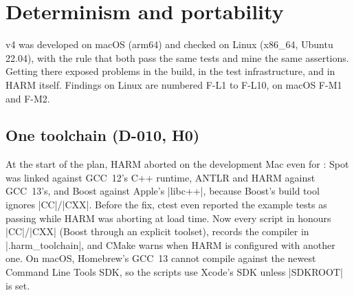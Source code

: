 \section{Determinism and portability}\label{sec:portability}
v4 was developed on macOS (arm64) and checked on Linux (x86\_64, Ubuntu 22.04), with the rule that both pass the same tests and mine the same assertions. Getting there exposed problems in the build, in the test infrastructure, and in HARM itself. Findings on Linux are numbered F-L1 to F-L10, on macOS F-M1 and F-M2.

\subsection{One toolchain (D-010, H0)}
At the start of the plan, HARM aborted on the development Mac even for : Spot was linked against GCC~12's C++ runtime, ANTLR and HARM against GCC~13's, and Boost against Apple's \code|libc++|, because Boost's build tool ignores \code|CC|/\code|CXX|. Before the fix, ctest even reported the example tests as passing while HARM was aborting at load time. Now every script in  honours \code|CC|/\code|CXX| (Boost through an explicit toolset), records the compiler in \code|.harm_toolchain|, and CMake warns when HARM is configured with another one. On macOS, Homebrew's GCC~13 cannot compile against the newest Command Line Tools SDK, so the scripts use Xcode's SDK unless \code|SDKROOT| is set.

